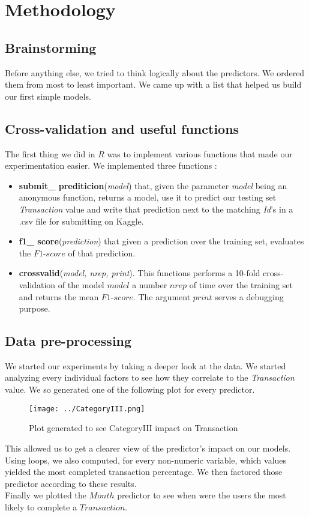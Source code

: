 \documentclass[11pt]{article}
\begin{document}
\newpage
\section*{Methodology}
\subsection*{Brainstorming}
Before anything else, we tried to think logically about the predictors. We ordered them from most to least important. We came up with a list that helped us build our first simple models.
\subsection*{Cross-validation and useful functions}
The first thing we did in $R$ was to implement various functions that made our experimentation easier. We implemented three functions :
\begin{itemize}
\item \textbf{submit\_ prediticion}(\emph{model}) that, given the parameter \emph{model} being an anonymous function, returns a model, use it to predict our testing set \emph{Transaction} value and write that prediction next to the matching \emph{Id}'s in a .csv file for submitting on Kaggle.
\item \textbf{f1\_ score}(\emph{prediction}) that given a prediction over the training set, evaluates the $F1$-$score$ of that prediction.
\item \textbf{crossvalid}(\emph{model, nrep, print}). This functions performs a 10-fold cross-validation of the model $model$ a number $nrep$ of time over the training set and returns the mean $F1$-$score$. The argument $print$ serves a debugging purpose.
\end{itemize}
\subsection*{Data pre-processing}
We started our experiments by taking a deeper look at the data. We started analyzing every individual factors to see how they correlate to the \emph{Transaction} value. We so generated one of the following plot for every predictor.\\

\begin{figure}[h]
\centering
\texttt{[image: ../CategoryIII.png]}
\caption{Plot generated to see CategoryIII impact on Transaction}
\end{figure}
\noindent This allowed us to get a clearer view of the predictor's impact on our models.\\
Using loops, we also computed, for every non-numeric variable, which values yielded the most completed transaction percentage. We then factored those predictor according to these results.\\
Finally we plotted the $Month$ predictor to see when were the users the most likely to complete a $Transaction$.
\end{document}
